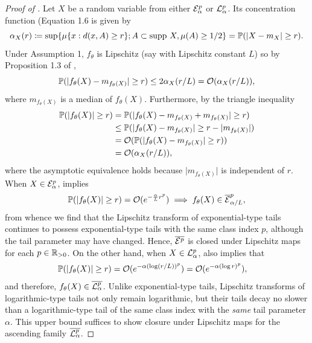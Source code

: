 \documentclass[../../thesis.tex]{subfiles}
\begin{document}
\begin{proof}[Proof of ]
  \label{proof:distn_class_closed}
  Let $X$ be a random variable from either $\mathcal{E}_\alpha^p$
  or $\mathcal{L}_\alpha^p$.
  Its concentration function
  (Equation 1.6 \citet{ledoux2001concentration}
  is given by
  \[
    \alpha_X(r)
    \coloneqq \sup \{ \mu\{x : d(x,A) \geq r\}; A \subset \text{supp}~X, \mu(A) \geq 1/2\}
    = \mathbb{P}(\lvert X - m_X \rvert \geq r) .
  \]
  Under Assumption 1, $f_\theta$ is Lipschitz (say with Lipschitz
  constant $L$) so by Proposition 1.3 of \citet{ledoux2001concentration},
  \[
    \mathbb{P}(\lvert f_\theta(X) - m_{f_\theta(X)}\rvert \geq r)
    \leq 2 \alpha_X(r/L)
    = \mathcal{O}(\alpha_X(r/L)),
  \]
  where $m_{f_\theta(X)}$ is a median of $f_\theta(X)$.
  Furthermore, by the triangle inequality
  \begin{align}
    \mathbb{P}(\lvert f_\theta(X) \rvert \geq r)
     & = \mathbb{P}(\lvert f_\theta(X) - m_{f_\theta(X)} + m_{f_\theta(X)} \rvert \geq r) \nonumber                 \\
     & \leq \mathbb{P}(\lvert f_\theta(X) - m_{f_\theta(X)}\rvert \geq r - \lvert m_{f_\theta(X)}\rvert ) \nonumber \\
     & = \mathcal{O}(\mathbb{P}(\lvert f_\theta(X) - m_{f_\theta(X)}\rvert \geq r)) \nonumber                               \\
     & = \mathcal{O}(\alpha_X(r/L)) ,
    \label{eq:pushforward-conc-fn}
  \end{align}
  where the asymptotic equivalence holds because $\lvert m_{f_\theta(X)} \rvert$ is independent of $r$.
  When $X \in \mathcal{E}_\alpha^p$,  implies
  \[
    \mathbb{P}(\lvert f_\theta(X) \rvert \geq r)
    = \mathcal{O}(e^{-\frac{\alpha}{L} r^p}) \implies f_\theta(X) \in \overline{\mathcal{E}}_{\alpha/L}^p,
  \]
  from whence we find that the Lipschitz transform of exponential-type
  tails continues to possess exponential-type tails with the same
  class index $p$, although the tail parameter may have changed. Hence,
  $\overline{\mathcal{E}^p}$ is closed under Lipschitz maps for each $p \in \mathbb{R}_{>0}$.
  On the other hand, when $X \in \mathcal{L}_\alpha^p$,  also implies that
  \begin{align*}
    \mathbb{P}(\lvert f_\theta(X) \rvert \geq r)
     & = \mathcal{O}(e^{-\alpha (\log (r/L))^p})
    = \mathcal{O}(e^{-\alpha (\log r)^p}),
  \end{align*}
  and therefore, $f_\theta(X) \in \overline{\mathcal{L}_\alpha^p}$.
  Unlike exponential-type tails, Lipschitz transforms of
  logarithmic-type tails not only remain logarithmic, but
  their tails decay no slower than a logarithmic-type tail
  of the same class index with the \emph{same} tail parameter $\alpha$.
  This upper bound suffices to show closure under Lipschitz maps for the
  ascending family $\overline{\mathcal{L}_\alpha^p}$.
\end{proof}
\end{document}
